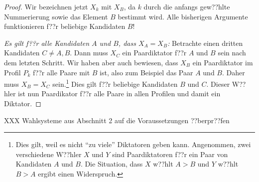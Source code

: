 \documentclass{zirkelblatt1415}
\theoremstyle{definition}
\newtheorem*{definition}{Definition}
\theoremstyle{definition}
\theoremstyle{definition}
\theoremstyle{definition}
\theoremstyle{remark}
\begin{document}
\begin{proof}
Wir bezeichnen jetzt $X_k$ mit $X_B$, da $k$ durch die anfangs gew??hlte Nummerierung sowie das Element $B$ bestimmt wird. Alle bisherigen Argumente funktionieren f??r beliebige Kandidaten $B$!

\emph{Es gilt f??r alle Kandidaten $A$ und $B$, dass $X_A=X_B$:} Betrachte einen dritten Kandidaten $C\neq A,B$. Dann muss $X_C$ ein Paardiktator f??r $A$ und $B$ sein nach dem letzten Schritt. Wir haben aber auch bewiesen, dass $X_B$ ein Paardiktator im Profil $P_k$ f??r alle Paare mit $B$ ist, also zum Beispiel das Paar $A$ und $B$. Daher muss $X_B=X_C$ sein.\footnote{Dies gilt, weil es nicht "`zu viele"' Diktatoren geben kann. Angenommen, zwei verschiedene W??hler $X$ und $Y$ sind Paardiktatoren f??r ein Paar von Kandidaten $A$ und $B$. Die Situation, dass $X$ w??hlt $A>B$ und $Y$ w??hlt $B>A$ ergibt einen Widerspruch.} Dies gilt f??r beliebige Kandidaten $B$ und $C$. Dieser W??hler ist nun Paardikator f??r alle Paare in allen Profilen und damit ein Diktator.
\end{proof}


XXX Wahlsysteme aus Abschnitt 2 auf die Voraussetzungen ??berpr??fen




\end{document}
